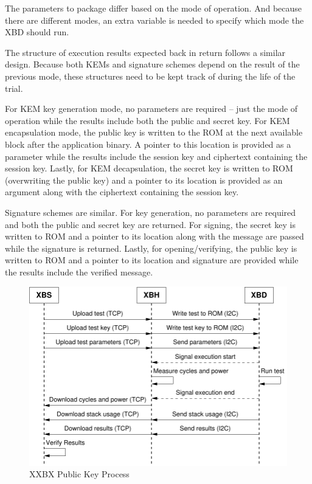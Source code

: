\documentclass[10pt]{article}
\begin{document}
The parameters to package differ based on the mode of operation. And because there are 
different modes, an extra variable is needed to specify which mode the XBD should run.

The structure of execution results expected back in return follows a similar design. 
Because both KEMs and signature schemes depend on the result of the previous mode, these 
structures need to be kept track of during the life of the trial. 


For KEM key generation mode, no parameters are required -- just the mode of operation while 
the results include both the public and secret key. For KEM encapsulation mode, the 
public key is written to the ROM at the next available block after the application binary. 
A pointer to this location is provided as a parameter while the results include the session 
key and ciphertext containing the session key. Lastly, for KEM decapsulation, the secret key 
is written to ROM (overwriting the public key) and a pointer to its location is provided as 
an argument along with the ciphertext containing the session key.

Signature schemes are similar. For key generation, no parameters are required and both the 
public and secret key are returned. For signing, the secret key is written to ROM and a 
pointer to its location along with the message are passed while the signature is returned. 
Lastly, for opening/verifying, the public key is written to ROM and a pointer to its location 
and signature are provided while the results include the verified message.


\begin{figure}[ht]
    \centering
    \includegraphics[scale=0.8]{../figures/xxbx_pk.pdf}
    \caption{XXBX Public Key Process}
    \label{fig:xxbx_pk}
\end{figure}
\end{document}
